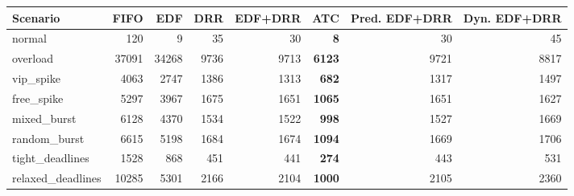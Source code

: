 \begin{tabular}{lrrrrrrr}
\toprule
Scenario & FIFO & EDF & DRR & EDF+DRR & ATC & Pred. EDF+DRR & Dyn. EDF+DRR \\
\midrule
normal & 120 & 9 & 35 & 30 & \textbf{8} & 30 & 45 \\
overload & 37091 & 34268 & 9736 & 9713 & \textbf{6123} & 9721 & 8817 \\
vip\_spike & 4063 & 2747 & 1386 & 1313 & \textbf{682} & 1317 & 1497 \\
free\_spike & 5297 & 3967 & 1675 & 1651 & \textbf{1065} & 1651 & 1627 \\
mixed\_burst & 6128 & 4370 & 1534 & 1522 & \textbf{998} & 1527 & 1669 \\
random\_burst & 6615 & 5198 & 1684 & 1674 & \textbf{1094} & 1669 & 1706 \\
tight\_deadlines & 1528 & 868 & 451 & 441 & \textbf{274} & 443 & 531 \\
relaxed\_deadlines & 10285 & 5301 & 2166 & 2104 & \textbf{1000} & 2105 & 2360 \\
\bottomrule
\end{tabular}
